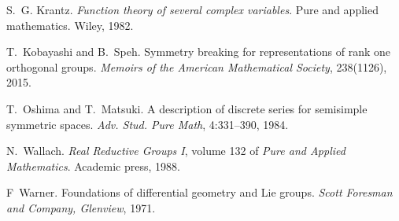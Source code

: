 \documentclass{article}
\newcommand{\tmtextit}[1]{{\itshape{#1}}}
\begin{document}
\begin{thebibliography}{CK{\O}P11}
  S.~G. Krantz.
  {\newblock}\tmtextit{Function theory of several complex variables}.
  {\newblock}Pure and applied mathematics. Wiley, 1982.
  
  T.~Kobayashi and B.~Speh.
  {\newblock}Symmetry breaking for representations of rank one orthogonal
  groups. {\newblock}\tmtextit{Memoirs of the American Mathematical Society},
  238(1126), 2015.
  
  T.~Oshima and T.~Matsuki. {\newblock}A
  description of discrete series for semisimple symmetric spaces.
  {\newblock}\tmtextit{Adv. Stud. Pure Math}, 4:331--390, 1984.
  
  N.~Wallach. {\newblock}\tmtextit{Real
  Reductive Groups I}, volume 132 of \tmtextit{Pure and Applied Mathematics}.
  {\newblock}Academic press, 1988.
  
  F~Warner. {\newblock}Foundations of
  differential geometry and Lie groups. {\newblock}\tmtextit{Scott Foresman
  and Company, Glenview}, 1971.
\end{thebibliography}
\end{document}
